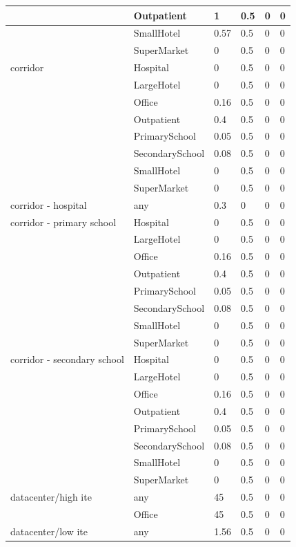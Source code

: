 \begin{center}
\begin{longtable}{|p{2.2in}|p{1.3in}|p{0.7in}|p{0.6in}|p{0.6in}|p{0.6in}|}
 & Outpatient & 1 & 0.5 & 0 & 0 \\ \hline
 & SmallHotel & 0.57 & 0.5 & 0 & 0 \\ \hline
 & SuperMarket & 0 & 0.5 & 0 & 0 \\ \hline
corridor & Hospital & 0 & 0.5 & 0 & 0 \\ \hline
 & LargeHotel & 0 & 0.5 & 0 & 0 \\ \hline
 & Office & 0.16 & 0.5 & 0 & 0 \\ \hline
 & Outpatient & 0.4 & 0.5 & 0 & 0 \\ \hline
 & PrimarySchool & 0.05 & 0.5 & 0 & 0 \\ \hline
 & SecondarySchool & 0.08 & 0.5 & 0 & 0 \\ \hline
 & SmallHotel & 0 & 0.5 & 0 & 0 \\ \hline
 & SuperMarket & 0 & 0.5 & 0 & 0 \\ \hline
corridor - hospital & any & 0.3 & 0 & 0 & 0 \\ \hline
corridor - primary school & Hospital & 0 & 0.5 & 0 & 0 \\ \hline
 & LargeHotel & 0 & 0.5 & 0 & 0 \\ \hline
 & Office & 0.16 & 0.5 & 0 & 0 \\ \hline
 & Outpatient & 0.4 & 0.5 & 0 & 0 \\ \hline
 & PrimarySchool & 0.05 & 0.5 & 0 & 0 \\ \hline
 & SecondarySchool & 0.08 & 0.5 & 0 & 0 \\ \hline
 & SmallHotel & 0 & 0.5 & 0 & 0 \\ \hline
 & SuperMarket & 0 & 0.5 & 0 & 0 \\ \hline
corridor - secondary school & Hospital & 0 & 0.5 & 0 & 0 \\ \hline
 & LargeHotel & 0 & 0.5 & 0 & 0 \\ \hline
 & Office & 0.16 & 0.5 & 0 & 0 \\ \hline
 & Outpatient & 0.4 & 0.5 & 0 & 0 \\ \hline
 & PrimarySchool & 0.05 & 0.5 & 0 & 0 \\ \hline
 & SecondarySchool & 0.08 & 0.5 & 0 & 0 \\ \hline
 & SmallHotel & 0 & 0.5 & 0 & 0 \\ \hline
 & SuperMarket & 0 & 0.5 & 0 & 0 \\ \hline
datacenter/high ite & any & 45 & 0.5 & 0 & 0 \\ \hline
 & Office & 45 & 0.5 & 0 & 0 \\ \hline
datacenter/low ite & any & 1.56 & 0.5 & 0 & 0 \\ \hline

\end{longtable}
\end{center}
